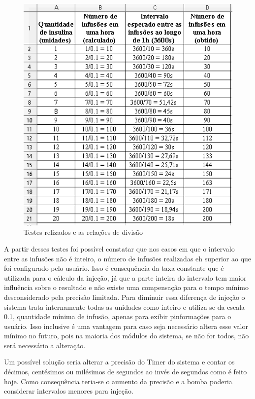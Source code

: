 \begin{figure}[htp]
	\centering
	\includegraphics[scale=1]{images/tabela_injecao.png}
	\caption{Testes relizados e as relações de divisão}	
	\label{fig:testeinsulina}
\end{figure}

A partir desses testes foi possível constatar que nos casos em que o intervalo entre as infusões não é inteiro, o número de infusões realizadas eh superior ao que foi configurado pelo usuário. Isso é consequência da taxa constante que é utilizada para o cálculo da injeção, já que a parte inteira do intervalo tem maior influência sobre o resultado e não existe uma compensação para o tempo mínimo desconsiderado pela precisão limitada. Para diminuir essa diferença de injeção o sistema trata internamente todas as unidades como inteiro e utiliza-se da escala 0.1, quantidade mínima de infusão, apenas para exibir pinformações para o usuário. Isso inclusive é uma vantagem para caso seja necessário altera esse valor mínimo no futuro, pois na maioria dos módulos do sistema, se não for todos, não será necessário a alteração.

Um possível solução seria alterar a precisão do Timer do sistema e contar os décimos, centésimos ou milésimos de segundos ao invés de segundos como é feito hoje. Como consequência teria-se o aumento da precisão e a bomba poderia considerar intervalos menores para injeção.

